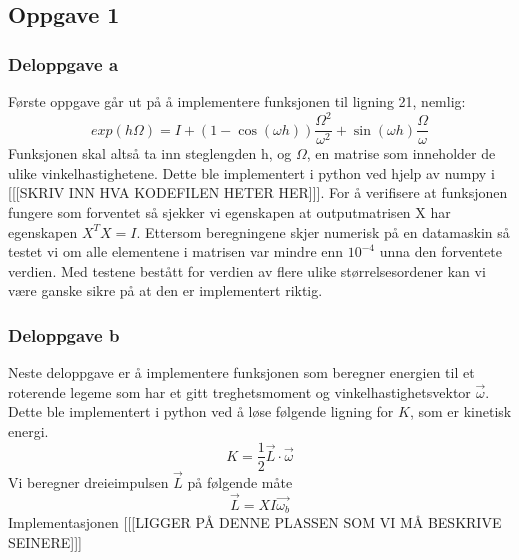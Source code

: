 \subsection{Oppgave 1}
\subsubsection{Deloppgave a}
Første oppgave går ut på å implementere funksjonen til ligning 21, nemlig: 
\begin{equation}
    exp(h\Omega) = \textit{I} + (1 - \cos(\omega h))\frac{\Omega^2}{\omega^2}+\sin(\omega h)\frac{\Omega}{\omega}
\end{equation}
Funksjonen skal altså ta inn steglengden h, og $\Omega$, en matrise som inneholder de ulike vinkelhastighetene. Dette ble implementert i python ved hjelp av numpy i [[[SKRIV INN HVA KODEFILEN HETER HER]]]. For å verifisere at funksjonen fungere som forventet så sjekker vi egenskapen at outputmatrisen X har egenskapen $X^T X = I$. Ettersom beregningene skjer numerisk på en datamaskin så testet vi om alle elementene i matrisen var mindre enn $10^{-4}$ unna den forventete verdien. Med testene bestått for verdien av flere ulike størrelsesordener kan vi være ganske sikre på at den er implementert riktig.
\subsubsection{Deloppgave b}
Neste deloppgave er å implementere funksjonen som beregner energien til et roterende legeme som har et gitt treghetsmoment og vinkelhastighetsvektor $\Vec{\omega}$. Dette ble implementert i python ved å løse følgende ligning for $K$, som er kinetisk energi.
\begin{equation}
    \textit{K} = \frac{1}{2}\vec{\textit{L}}\cdot \vec{\omega}
\end{equation}
Vi beregner dreieimpulsen $\vec{L}$ på følgende måte
\begin{equation}
\label{eq:dreieimpuls}
    \vec{L}=XI\vec{\omega_b}
\end{equation}
Implementasjonen [[[LIGGER PÅ DENNE PLASSEN SOM VI MÅ BESKRIVE SEINERE]]]
